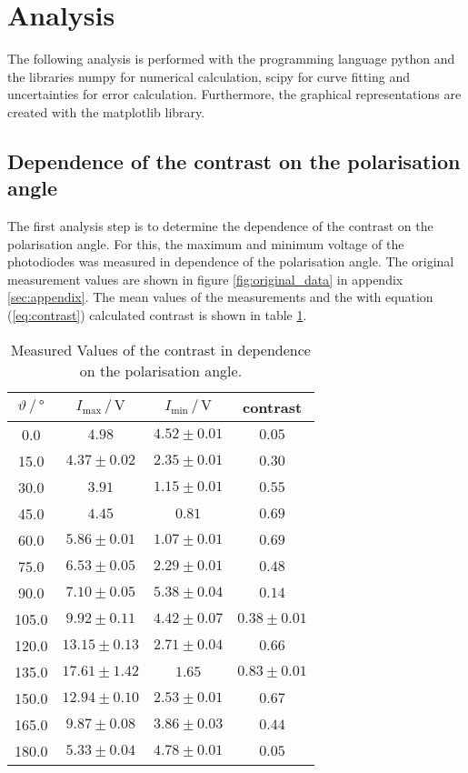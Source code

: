 \section{Analysis}
\label{sec:Analysis}

The following analysis is performed with the programming language python \cite{python} and the libraries numpy \cite{numpy} for numerical calculation, scipy \cite{scipy} for curve fitting and uncertainties \cite{uncertainties} for error calculation.
Furthermore, the graphical representations are created with the matplotlib \cite{matplotlib} library.

\subsection{Dependence of the contrast on the polarisation angle}
\label{subsec:polarisation}

The first analysis step is to determine the dependence of the contrast on the polarisation angle.
For this, the maximum and minimum voltage of the photodiodes was measured in dependence of the polarisation angle.
The original measurement values are shown in figure \ref{fig:original_data} in appendix \ref{sec:appendix}.
The mean values of the measurements and the with equation (\ref{eq:contrast}) calculated contrast is shown in table \ref{tab:values_polarisation}.

\begin{table}[H]
    \centering
    \caption{Measured Values of the contrast in dependence on the polarisation angle.}
    \label{tab:values_polarisation}
    \begin{tabular}{c c c c}
        \toprule
        $\vartheta \,/\, \si{\degree}$ & $I_{\text{max}}\,/\,\si{\volt}$ & $I_{\text{min}}\,/\,\si{\volt}$ & contrast \\
        \midrule
        0.0 & $4.98$ & $4.52\pm0.01$ & $0.05$ \\
        15.0 & $4.37\pm0.02$ & $2.35\pm0.01$ & $0.30$ \\
        30.0 & $3.91$ & $1.15\pm0.01$ & $0.55$ \\
        45.0 & $4.45$ & $0.81$ & $0.69$ \\
        60.0 & $5.86\pm0.01$ & $1.07\pm0.01$ & $0.69$ \\
        75.0 & $6.53\pm0.05$ & $2.29\pm0.01$ & $0.48$ \\
        90.0 & $7.10\pm0.05$ & $5.38\pm0.04$ & $0.14$ \\
        105.0 & $9.92\pm0.11$ & $4.42\pm0.07$ & $0.38\pm0.01$ \\
        120.0 & $13.15\pm0.13$ & $2.71\pm0.04$ & $0.66$ \\
        135.0 & $17.61\pm1.42$ & $1.65$ & $0.83\pm0.01$ \\
        150.0 & $12.94\pm0.10$ & $2.53\pm0.01$ & $0.67$ \\
        165.0 & $9.87\pm0.08$ & $3.86\pm0.03$ & $0.44$ \\
        180.0 & $5.33\pm0.04$ & $4.78\pm0.01$ & $0.05$ \\
        \bottomrule
    \end{tabular}
\end{table}

